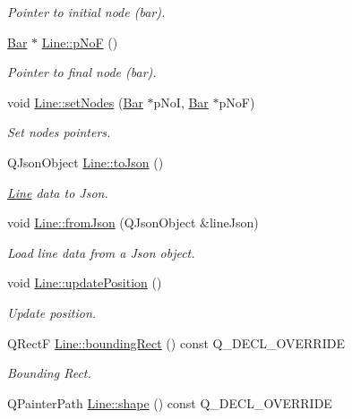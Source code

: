 \begin{DoxyCompactItemize}
\begin{DoxyCompactList}\small\item\em Pointer to initial node (bar). \end{DoxyCompactList}\item 
\hyperlink{class_bar}{Bar} $\ast$ \hyperlink{group___models_gabbc73ddedd3075c33ae5331bd7c9829f}{Line\+::p\+No\+F} ()
\begin{DoxyCompactList}\small\item\em Pointer to final node (bar). \end{DoxyCompactList}\item 
void \hyperlink{group___models_gaeeab146e6c1d7d1a688a2764a9c9a170}{Line\+::set\+Nodes} (\hyperlink{class_bar}{Bar} $\ast$p\+No\+I, \hyperlink{class_bar}{Bar} $\ast$p\+No\+F)
\begin{DoxyCompactList}\small\item\em Set nodes pointers. \end{DoxyCompactList}\item 
Q\+Json\+Object \hyperlink{group___models_ga4effa7a96db465ea6e01135d5a010739}{Line\+::to\+Json} ()
\begin{DoxyCompactList}\small\item\em \hyperlink{class_line}{Line} data to Json. \end{DoxyCompactList}\item 
void \hyperlink{group___models_ga62623ad71df5279377cc69da90decc75}{Line\+::from\+Json} (Q\+Json\+Object \&line\+Json)
\begin{DoxyCompactList}\small\item\em Load line data from a Json object. \end{DoxyCompactList}\item 
void \hyperlink{group___models_ga8fdb12651d4bc592616d241386b066b3}{Line\+::update\+Position} ()
\begin{DoxyCompactList}\small\item\em Update position. \end{DoxyCompactList}\item 
Q\+Rect\+F \hyperlink{group___models_gad15c3af158d3b966c04be7e18cee5aea}{Line\+::bounding\+Rect} () const Q\+\_\+\+D\+E\+C\+L\+\_\+\+O\+V\+E\+R\+R\+I\+D\+E
\begin{DoxyCompactList}\small\item\em Bounding Rect. \end{DoxyCompactList}\item 
Q\+Painter\+Path \hyperlink{group___models_gaf1736b829a643d99052ef6428ddd5b16}{Line\+::shape} () const Q\+\_\+\+D\+E\+C\+L\+\_\+\+O\+V\+E\+R\+R\+I\+D\+E

\end{DoxyCompactItemize}
